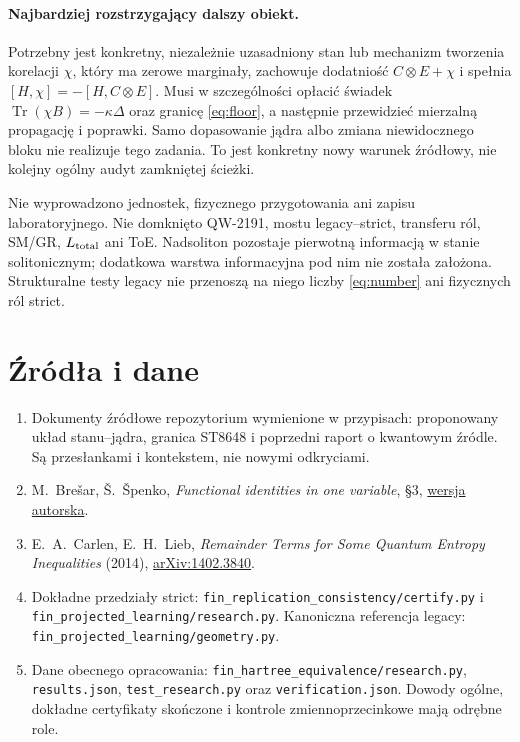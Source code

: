 \documentclass[11pt,a4paper]{article}
\newcommand{\Tr}{\operatorname{Tr}}
\begin{document}
\paragraph{Najbardziej rozstrzygający dalszy obiekt.}
Potrzebny jest konkretny, niezależnie uzasadniony stan lub mechanizm
tworzenia korelacji $\chi$, który ma zerowe marginały, zachowuje
dodatniość $C\otimes E+\chi$ i spełnia
$[H,\chi]=-[H,C\otimes E]$. Musi w szczególności opłacić świadek
$\Tr(\chi B)=-\kappa\Delta$ oraz granicę \eqref{eq:floor},
a następnie przewidzieć mierzalną propagację i poprawki.
Samo dopasowanie jądra albo zmiana niewidocznego bloku nie realizuje
tego zadania. To jest konkretny nowy warunek źródłowy, nie kolejny
ogólny audyt zamkniętej ścieżki.

Nie wyprowadzono jednostek, fizycznego przygotowania ani zapisu
laboratoryjnego. Nie domknięto QW-2191, mostu legacy--strict,
transferu ról, SM/GR, $L_{\rm total}$ ani ToE. Nadsoliton pozostaje
pierwotną informacją w stanie solitonicznym; dodatkowa warstwa
informacyjna pod nim nie została założona. Strukturalne testy legacy
nie przenoszą na niego liczby \eqref{eq:number} ani fizycznych ról strict.

\section*{Źródła i dane}
\begin{enumerate}
\item Dokumenty źródłowe repozytorium wymienione w przypisach:
proponowany układ stanu--jądra, granica ST8648 i poprzedni raport
o kwantowym źródle. Są przesłankami i kontekstem, nie nowymi odkryciami.
\item M.~Brešar, Š.~Špenko, \emph{Functional identities in one variable},
§3, \href{https://users.fmf.uni-lj.si/bresar/documents/FIonevar.pdf}{wersja autorska}.
\item E.~A.~Carlen, E.~H.~Lieb, \emph{Remainder Terms for Some Quantum
Entropy Inequalities} (2014),
\href{https://arxiv.org/abs/1402.3840}{arXiv:1402.3840}.
\item Dokładne przedziały strict:
\texttt{fin\_replication\_consistency/certify.py} i
\texttt{fin\_projected\_learning/research.py}.
Kanoniczna referencja legacy:
\texttt{fin\_projected\_learning/geometry.py}.
\item Dane obecnego opracowania:
\texttt{fin\_hartree\_equivalence/research.py},
\texttt{results.json}, \texttt{test\_research.py} oraz
\texttt{verification.json}. Dowody ogólne, dokładne certyfikaty
skończone i kontrole zmiennoprzecinkowe mają odrębne role.
\end{enumerate}
\end{document}
